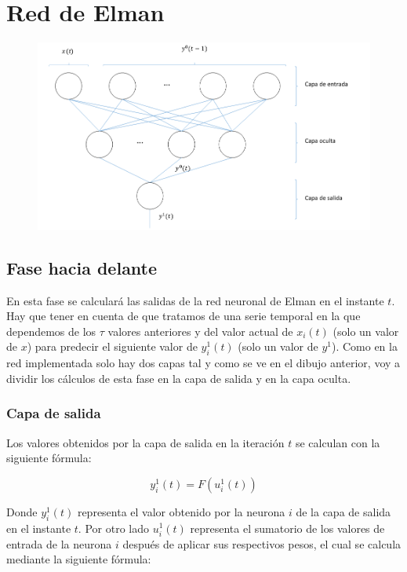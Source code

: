 \documentclass[a4paper,11pt]{article}
\begin{document}
\newpage
\section{Red de Elman}

\begin{figure}[!htbp]
	\centering
	\includegraphics[width=1.0\textwidth]{red_elman.png}
\end{figure}

\subsection{Fase hacia delante}
En esta fase se calculará las salidas de la red neuronal de Elman en el instante ${t}$. Hay que tener en cuenta de que tratamos de una serie temporal en la que dependemos de los ${\tau}$ valores anteriores y del valor actual de ${x_{i}(t)}$ (solo un valor de ${x}$) para predecir el siguiente valor de ${y_{i}^{1}(t)}$ (solo un valor de ${y^{1}}$). Como en la red implementada solo hay dos capas tal y como se ve en el dibujo anterior, voy a dividir los cálculos de esta fase en la capa de salida y en la capa oculta.

\subsubsection{Capa de salida}
Los valores obtenidos por la capa de salida en la iteración ${t}$ se calculan con la siguiente fórmula:

\begin{equation}
	\label{elman_salida_y}
	y_{i}^{1}(t) = F\left(u_{i}^{1}(t)\right)
\end{equation}

Donde ${y_{i}^{1}(t)}$ representa el valor obtenido por la neurona ${i}$ de la capa de salida en el instante ${t}$. Por otro lado ${u_{i}^{1}(t)}$ representa el sumatorio de los valores de entrada de la neurona ${i}$ después de aplicar sus respectivos pesos, el cual se calcula mediante la siguiente fórmula:
\end{document}
